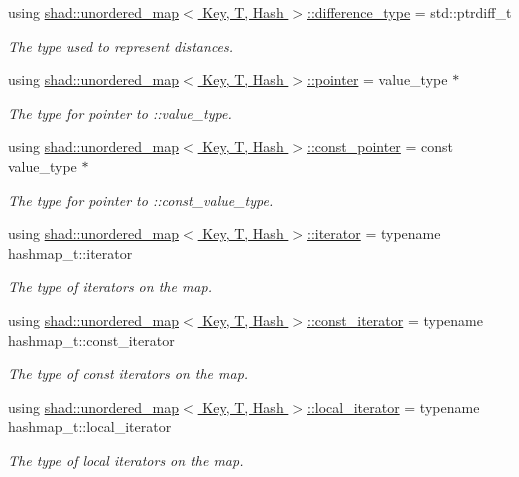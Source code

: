 \begin{DoxyCompactItemize}
using \hyperlink{group__Types_ga2a1294efcd043aa4bbb5da7c3c811448}{shad\-::unordered\-\_\-map$<$ Key, T, Hash $>$\-::difference\-\_\-type} = std\-::ptrdiff\-\_\-t
\begin{DoxyCompactList}\small\item\em The type used to represent distances. \end{DoxyCompactList}\item 
using \hyperlink{group__Types_ga94466a187a2da262cb5b58356c3ac24c}{shad\-::unordered\-\_\-map$<$ Key, T, Hash $>$\-::pointer} = value\-\_\-type $\ast$
\begin{DoxyCompactList}\small\item\em The type for pointer to \-::value\-\_\-type. \end{DoxyCompactList}\item 
using \hyperlink{group__Types_ga4db9d56c27ddb72ccad61249ef55c54c}{shad\-::unordered\-\_\-map$<$ Key, T, Hash $>$\-::const\-\_\-pointer} = const value\-\_\-type $\ast$
\begin{DoxyCompactList}\small\item\em The type for pointer to \-::const\-\_\-value\-\_\-type. \end{DoxyCompactList}\item 
using \hyperlink{group__Types_gab52d604c26835c20a0363f9affa7ff57}{shad\-::unordered\-\_\-map$<$ Key, T, Hash $>$\-::iterator} = typename hashmap\-\_\-t\-::iterator
\begin{DoxyCompactList}\small\item\em The type of iterators on the map. \end{DoxyCompactList}\item 
using \hyperlink{group__Types_ga102c3cd521767bf4b22f3788ccc054e8}{shad\-::unordered\-\_\-map$<$ Key, T, Hash $>$\-::const\-\_\-iterator} = typename hashmap\-\_\-t\-::const\-\_\-iterator
\begin{DoxyCompactList}\small\item\em The type of const iterators on the map. \end{DoxyCompactList}\item 
using \hyperlink{group__Types_ga520d395c30b2b19179153108ea694cec}{shad\-::unordered\-\_\-map$<$ Key, T, Hash $>$\-::local\-\_\-iterator} = typename hashmap\-\_\-t\-::local\-\_\-iterator
\begin{DoxyCompactList}\small\item\em The type of local iterators on the map. \end{DoxyCompactList}\item 

\end{DoxyCompactItemize}
